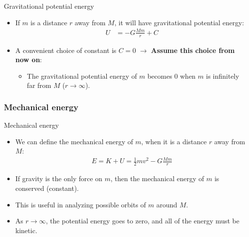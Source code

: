 \documentclass[aspectratio=169,
hyperref={colorlinks,urlcolor=blue}
]{beamer}
\begin{document}
\begin{frame}{Gravitational potential energy}
\begin{itemize}
\item If $m$ is a distance $r$ away from $M$, it will have gravitational potential energy:
\begin{align*}
U&= -G\frac{Mm}{r}+C
\end{align*}
\item A convenient choice of constant is $C = 0$ $\rightarrow$ \textbf{Assume this choice from now on}:
\begin{itemize}
\item[$\rightarrow$] The gravitational potential energy of $m$ becomes 0 when $m$ is infinitely far from $M$ ($r\to\infty$).
\end{itemize}

\end{itemize}

\end{frame}




\subsubsection{Mechanical energy}
\label{subsubsec:mechanicalenergygrav}
\begin{frame}{Mechanical energy}
\begin{itemize}
\item We can define the mechanical energy of $m$, when it is a distance $r$ away from $M$:
\begin{align*}
E=K+U=\frac{1}{2}mv^2-G\frac{Mm}{r}
\end{align*}
\item If gravity is the only force on $m$, then the mechanical energy of $m$ is conserved (constant).
\item This is useful in analyzing possible orbits of $m$ around $M$.
\item As $r\to\infty$, the potential energy goes to zero, and all of the energy must be kinetic.
\end{itemize}
\end{frame}


\end{document}
